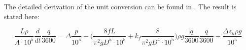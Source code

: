 
The detailed derivation of the unit conversion can be found in . The result is stated here: 

\begin{equation}
   \frac{L \rho}{A\cdot10^5} \frac{d}{dt}\frac{q}{3600} = \Delta \frac{p}{10^5} - \Big(\frac{8fL}{\pi^{2}gD^5\cdot10^5} + k_f \frac{8}{\pi^2gD^4\cdot10^5}\Big) \rho g \frac{|q|}{3600} \frac{q}{3600} - \frac{\Delta z_h \rho g}{10^5}
\end{equation}
